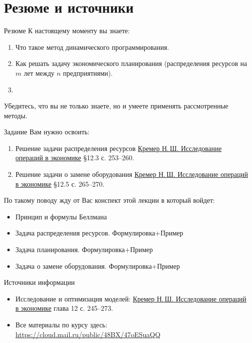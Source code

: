 \documentclass[unicode,11pt,notheorems,xcolor=table]{beamer}
\begin{document}
\section{Резюме и источники}
\begin{frame}{Резюме}
	К настоящему моменту вы знаете:
	\begin{enumerate}
	\item 
		Что такое метод динамического программирования. 
	\item 
		Как решать задачу экономического планирования (распределения ресурсов на $m$ лет между $n$ предприятиями).
	\item 
	\end{enumerate}
	\bigskip
		Убедитесь, что вы не только знаете, но и умеете применять рассмотренные методы.
\end{frame}		
\begin{frame}{Задание}
	\alert{Вам нужно освоить:}
	\begin{enumerate}
	\item Решение задачи распределения ресурсов {\color{blue}\href{https://cloud.mail.ru/public/4SN3/2MJYgEz95}{Кремер  Н.\,Ш. Исследование операций в экономике}} \S 12.3 с. 253--260.
	\item Решение задачи о замене оборудования {\color{blue}\href{https://cloud.mail.ru/public/4SN3/2MJYgEz95}{Кремер  Н.\,Ш. Исследование операций в экономике}} \S 12.5 с. 265--270.	
	\end{enumerate}

	\vspace{1cm}
	По такому поводу \alert{жду от Вас конспект этой лекции} в который войдет:
	\begin{itemize}
	\item 
		Принцип и формулы Беллмана
	\item 
		Задача распределения ресурсов. Формулировка+Пример
	\item 
		Задача планирования. Формулировка+Пример
	\item 
		Задача о замене оборудования. Формулировка+Пример
	\end{itemize}
\end{frame}

\begin{frame}{Источники информации}
\begin{itemize}
\item
	Исследование и оптимизация моделей:  {\color{blue}\href{https://cloud.mail.ru/public/4SN3/2MJYgEz95}{Кремер  Н.\,Ш. Исследование операций в экономике}} глава 12 с. 245--273.

\item 
	Все материалы по курсу здесь:
{\color{blue}\url{https://cloud.mail.ru/public/48BX/47oESuaQQ}}
\end{itemize}

\end{frame}
\end{document}
